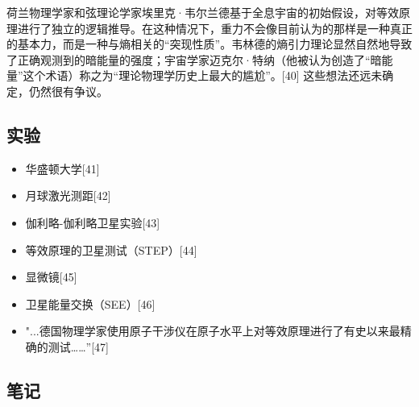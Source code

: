 荷兰物理学家和弦理论学家埃里克·韦尔兰德基于全息宇宙的初始假设，对等效原理进行了独立的逻辑推导。在这种情况下，重力不会像目前认为的那样是一种真正的基本力，而是一种与熵相关的“突现性质”。韦林德的熵引力理论显然自然地导致了正确观测到的暗能量的强度；宇宙学家迈克尔·特纳（他被认为创造了“暗能量”这个术语）称之为“理论物理学历史上最大的尴尬”。[40] 这些想法还远未确定，仍然很有争议。

\subsection{实验}

\begin{itemize}
\item 华盛顿大学[41]
\item 月球激光测距[42]
\item 伽利略-伽利略卫星实验[43]
\item 等效原理的卫星测试（STEP）[44]
\item 显微镜[45]
\item 卫星能量交换（SEE）[46]
\item "...德国物理学家使用原子干涉仪在原子水平上对等效原理进行了有史以来最精确的测试……”[47]
\end{itemize}


\subsection{笔记}

